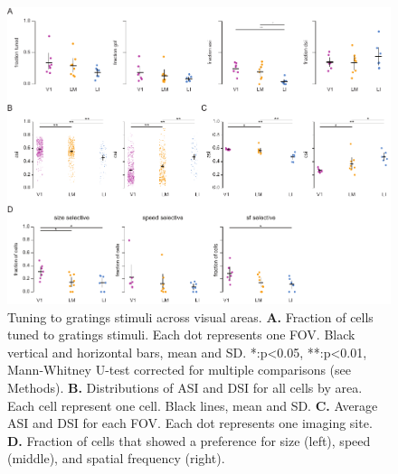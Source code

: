\begin{figure}[t!]
\includegraphics[width=\textwidth]{figures/supplemental/fig_s13_gratings_aggregate/fig_s13_gratings_aggregate.pdf}
    \vspace{.1in}
    \caption[Aggregated gratings metrics]{Tuning to gratings stimuli across visual areas.
    \textbf{A.} Fraction of cells tuned to gratings stimuli. Each dot represents one FOV. Black vertical and horizontal bars, mean and SD. *:p<0.05, **:p<0.01, Mann-Whitney U-test corrected for multiple comparisons (see Methods).
    \textbf{B.} Distributions of ASI and DSI for all cells by area. Each cell represent one cell. Black lines, mean and SD.
    \textbf{C.} Average ASI and DSI for each FOV. Each dot represents one imaging site.
    \textbf{D.} Fraction of cells that showed a preference for size (left), speed (middle), and spatial frequency (right). 
    \label{supfig:gratings_aggregate}}
\end{figure}


